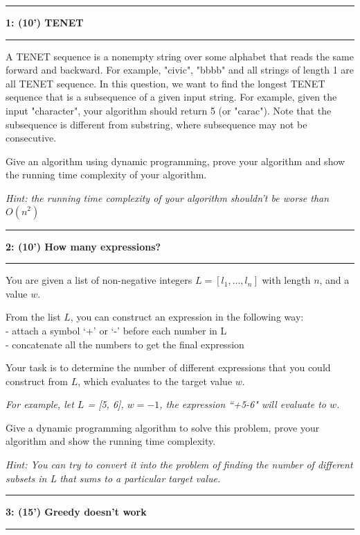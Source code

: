 \documentclass[10.5pt]{article}
\newcommand\question[2]{\vspace{.25in}\hrule\textbf{#1: #2}\vspace{.5em}\hrule\vspace{.10in}}
\begin{document}
\newpage
\question{1}{(10') TENET}
A TENET sequence is a nonempty string over some alphabet that reads the same forward and backward. For example, "civic", "bbbb" and all strings of length 1 are all TENET sequence. In this question, we want to find the longest TENET sequence that is a subsequence of a given input string. For example, given the input "character", your algorithm should return 5 (or "carac"). Note that the subsequence is different from substring, where subsequence may not be 
consecutive. 

Give an algorithm using dynamic programming, prove your algorithm and  show the running time complexity of your algorithm. 

\textit{Hint: the running time complexity of your algorithm shouldn't be worse than $O(n^{2})$}
	
\pagebreak
	

\question{2}{(10') How many expressions?}
You are given a list of non-negative integers $L=[l_1,...,l_n]$ with length $n$, and a value $w$.

From the list $L$, you can construct an expression in the following way:\\
\hspace*{0.5cm}- attach a symbol `+' or `-' before each number in L\\
\hspace*{0.5cm}- concatenate all the numbers to get the final expression

Your task is to determine the number of different expressions that you could construct from $L$, which evaluates to the target value $w$.

\textit{For example, let $L$ = [5, 6], $w=-1$, the expression ``+5-6" will evaluate to $w$.}

Give a dynamic programming algorithm to solve this problem, prove your algorithm and show the running
time complexity.

\textit{Hint: You can try to convert it into the problem of finding the number of different subsets in L that sums to a particular target value.}

\pagebreak

\question{3}{(15') Greedy doesn't work}
\end{document}
